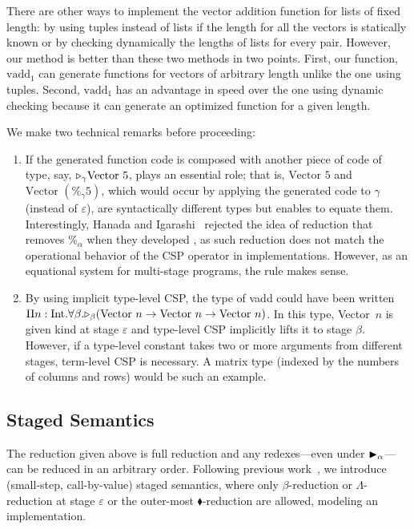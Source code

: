 There are other ways to implement the vector addition function for
lists of fixed length: by using tuples instead of lists if the length
for all the vectors is statically known or by checking dynamically the
lengths of lists for every pair.  However, our method is better than
these two methods in two points.  First, our function, $\text{vadd}_1$
can generate functions for vectors of arbitrary length unlike the one
using tuples.  Second, $\text{vadd}_1$ has an advantage in speed over
the one using dynamic checking because it can generate an optimized
function for a given length.

We make two technical remarks before proceeding:
\begin{enumerate}
\item If the generated function code is composed with another piece of code of type, say,
\({\mathop{\triangleright}}_\gamma \text{Vector }5\), \QPercent{} plays an essential role; that is,
\(\text{Vector }5\) and \(\text{Vector }(\%_\gamma 5)\), which would occur
by applying the generated code to \(\gamma\) (instead of \(\varepsilon\)), are syntactically
different types but \QPercent{} enables to equate them.
Interestingly, Hanada and Igarashi~\cite{Hanada2014} rejected the idea of
reduction that removes $\%_\alpha$ when they developed \LTP{}, as such
reduction does not match the operational behavior of the CSP operator in
implementations. However, as an equational system for multi-stage programs,
the rule \QPercent{} makes sense.
\item \renewcommand{\Vpn}{\text{Vector}\ n}
By using implicit type-level CSP, the type of vadd
could have been written
\(\Pi n:\I.\F\beta.\TW_\beta(\Vpn\to\Vpn\to\Vpn)\).  In this type,
Vector\ $n$ is given kind at stage \(\varepsilon\) and type-level CSP
implicitly lifts it to stage \(\beta\).  However, if a type-level
constant takes two or more arguments from different stages, term-level
CSP is necessary.  A matrix type (indexed by the numbers of columns
and rows) would be such an example.
\end{enumerate}


\subsection{Staged Semantics}

The reduction given above is full reduction and any redexes---even
under ${\mathop{\blacktriangleright}}_\alpha$---can be reduced in an arbitrary order.
Following previous work~\cite{Hanada2014},
we introduce (small-step, call-by-value) staged semantics,
where only $\beta$-reduction or $\Lambda$-reduction at stage $\varepsilon$ or the outer-most $\blacklozenge$-reduction are allowed,
modeling an implementation.

